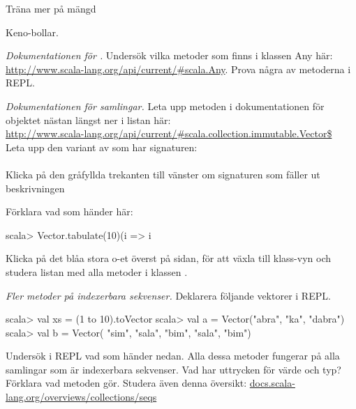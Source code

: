 {{\Task Träna mer på mängd  

\Subtask Keno-bollar.






\AdvancedTasks %

\Task \emph{Dokumentationen för .} Undersök vilka metoder som finns i klassen Any här: \href{http://www.scala-lang.org/api/current/\#scala.Any}{http://www.scala-lang.org/api/current/\#scala.Any}. Prova några av metoderna i REPL.

\Task \emph{Dokumentationen för samlingar.} Leta upp metoden  i dokumentationen för objektet  nästan längst ner i listan här: \\ \href{http://www.scala-lang.org/api/current/#scala.collection.immutable.Vector$}{http://www.scala-lang.org/api/current/\#scala.collection.immutable.Vector\$} \\Leta upp den variant av  som har signaturen:\\ \\ Klicka på den gråfyllda trekanten till vänster om signaturen som fäller ut beskrivningen

\Subtask Förklara vad som händer här:
\begin{REPLnonum}
scala> Vector.tabulate(10)(i => i %
\end{REPLnonum}

\Subtask Klicka på det blåa stora o-et överst på sidan, för att växla till klass-vyn och studera listan med alla metoder  i klassen . 


\Task \emph{Fler metoder på indexerbara sekvenser.} Deklarera följande vektorer i REPL. 
\begin{REPL}
scala> val xs = (1 to 10).toVector
scala> val a = Vector("abra", "ka", "dabra")
scala> val b = Vector( "sim", "sala", "bim", "sala", "bim")
\end{REPL}
Undersök i REPL vad som händer nedan. Alla dessa metoder fungerar på alla samlingar som är indexerbara sekvenser. Vad har uttrycken för värde och typ? Förklara vad metoden gör. Studera även denna  översikt: \href{http://docs.scala-lang.org/overviews/collections/seqs}{docs.scala-lang.org/overviews/collections/seqs}

\Subtask {}  %

\Subtask {}  %

\Subtask {} %

}}
